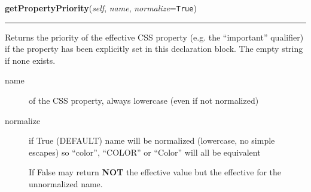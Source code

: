 \hspace{.8\funcindent}\begin{boxedminipage}{\funcwidth}

    \raggedright \textbf{getPropertyPriority}(\textit{self}, \textit{name}, \textit{normalize}={\tt True})

    \vspace{-1.5ex}

    \rule{\textwidth}{0.5\fboxrule}
\setlength{\parskip}{2ex}

Returns the priority of the effective CSS property (e.g. the
``important'' qualifier) if the property has been explicitly set in
this declaration block. The empty string if none exists.
\begin{description}
\item[{name}] \leavevmode 
of the CSS property, always lowercase (even if not normalized)

\item[{normalize}] \leavevmode 
if True (DEFAULT) name will be normalized (lowercase, no simple
escapes) so ``color'', ``COLOR'' or ``Color'' will all be equivalent

If False may return \textbf{NOT} the effective value but the effective
for the unnormalized name.

\end{description}
\setlength{\parskip}{1ex}
    \end{boxedminipage}

    \label{cssutils:css:cssstyledeclaration:CSSStyleDeclaration:removeProperty}

    \vspace{0.5ex}

